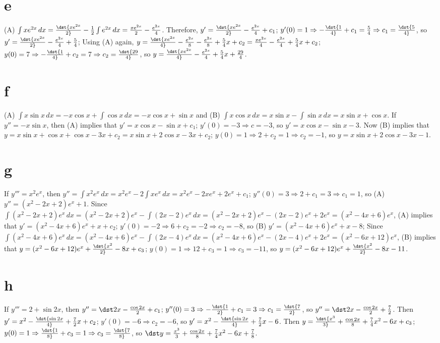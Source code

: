 \documentclass[dvips]{book}
\numberwithin{example}{section}
\numberwithin{equation}{section}
\numberwithin{theorem}{section}
\numberwithin{table}{section}
\numberwithin{figure}{section}
\begin{document}
\enlargethispage{1in}
\part{e} (A) $\int xe^{2x}\,dx=\dst{xe^{2x}\over2}-{1\over2}
\int e^{2x}\,dx={xe^{2x}\over2}-{e^{2x}\over4}$. Therefore,
$y'=\dst{xe^{2x}\over2}-{e^{2x}\over4}+c_1$; $y'(0)=1\Rightarrow
-\dst{1\over4}+c_1={5\over4}\Rightarrow c_1=\dst{5\over4}$,
so $y'=\dst{xe^{2x}\over2}-{e^{2x}\over4}+{5\over4}$;
Using (A) again,
$y=\dst{xe^{2x}\over4}-{e^{2x}\over8}-{e^{2x}\over8}+{5\over4}x+c_2
={xe^{2x}\over4}-{e^{2x}\over4}+{5\over4}x+c_2$; $y(0)=7
\Rightarrow-\dst{1\over4}+c_2=7\Rightarrow c_2=\dst{29\over4}$, so
$y=\dst{xe^{2x}\over4}-{e^{2x}\over4}+{5\over4}x+{29\over4}$.

\part{f} (A) $\int x\sin x\,dx=-x\cos x+\int \cos x\,dx=-x\cos x+\sin
x$ and (B) $\int x\cos x\,dx=x\sin x-\int\sin x\,dx=x\sin x+\cos x$.
If $y''=-x\sin x$, then (A) implies that $y'=x\cos x-\sin x+c_1$;
$y'(0)=-3\Rightarrow c=-3$, so $y'=x\cos x-\sin x-3$. Now (B) implies
that $y=x\sin x+\cos x+\cos x-3x+c_2=x\sin x+2\cos x-3x+c_2$;
$y(0)=1\Rightarrow 2+c_2=1\Rightarrow c_2=-1$, so $y=x \sin x+2 \cos
x-3x-1$.


\part{g} If $y'''=x^2e^x$, then $y''=\int x^2e^x\,dx=x^2e^x-2\int
xe^x\,dx=x^2e^x-2xe^x+2e^x+c_1$; $y''(0)=3\Rightarrow
2+c_1=3\Rightarrow c_1=1$, so (A) $y''=(x^2-2x+2)e^x+1$. Since $\int
(x^2-2x+2)e^x\,dx=(x^2-2x+2)e^x-\int (2x-2)e^x\,dx
=(x^2-2x+2)e^x-(2x-2)e^x+2e^x=(x^2-4x+6)e^x$, (A) implies that
$y'=(x^2-4x+6)e^x+x+c_2$; $y'(0)=-2\Rightarrow 6+c_2=-2\Rightarrow
c_2=-8$, so (B) $y'=(x^2-4x+6)e^x+x-8$; Since $\int
(x^2-4x+6)e^x\,dx=(x^2-4x+6)e^x-\int (2x-4)e^x\,dx
=(x^2-4x+6)e^x-(2x-4)e^x+2e^x=(x^2-6x+12)e^x$, (B) implies that
$y=(x^2-6x+12)e^x+\dst{x^2\over2}-8x+c_3$; $y(0)=1\Rightarrow
12+c_3=1\Rightarrow c_3=-11$, so
$y=(x^2-6x+12)e^x+\dst{x^2\over2}-8x-11$.

\part{h} If $y'''=2+\sin2x$, then $y''=\dst2x-{\cos 2x\over 2}+c_1$;
$y''(0)=3\Rightarrow -\dst{1\over 2}+c_1=3\Rightarrow c_1=\dst{7\over
2}$, so $y''=\dst2x-{\cos 2x\over 2}+{7\over 2}$. Then
$y'=x^2-\dst{\sin 2x\over 4}+{7\over 2}x+c_2$; $y'(0)=-6\Rightarrow
c_2=-6$, so $y'=x^2-\dst{\sin 2x\over 4}+{7\over 2}x-6$. Then
$y=\dst{x^3\over 3}+{\cos 2x\over 8}+{7\over 4}x^2-6x+c_3$;
$y(0)=1\Rightarrow \dst{1\over 8}+c_3=1\Rightarrow c_3=\dst{7\over
8}$, so $\dst y={x^3\over3}+{\cos 2x\over8}+
{7\over4}x^2-6x+{7\over8}$.
\end{document}

